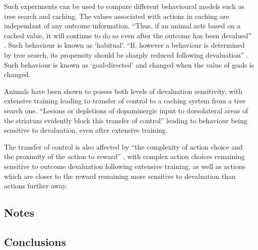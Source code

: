 \documentclass[10pt]{article}
\begin{document}
		Such experiments can be used to compare different behavioural models such as tree search and caching. The values associated with actions in caching are independant of any outcome information. ``Thus, if an animal acts based on a cached value, it will continue to do so even after the outcome has been devalued'' \parencite{Daw}. Such behaviour is known as `habitual'. ``If, however a behaviour is determined by tree search, its propensity should be sharply reduced following devaluation'' \parencite{Daw}. Such behaviour is known as `goal-directed' and changed when the value of goals is changed.

		Animals have been shown to posess both levels of devaluation sensitivity, with extensive training leading to transfer of control to a caching system from a tree search one. ``Lesions or depletions of dopaminergic input to dorsolateral areas of the striatum evidently block this transfer of control'' \parencite{Daw} leading to behaviour being sensitive to devaluation, even after extensive training.

		The transfer of control is also affected by ``the complexity of action choice and the proximity of the action to reward'' \parencite{Daw}, with complex action choices remaining sensitive to outcome devaluation following extensive training, as well as actions which are closer to the reward remaining more sensitive to devaluation than actions further away.


\subsection{Notes}

\subsection{Conclusions}

\printbibliography
\end{document}
